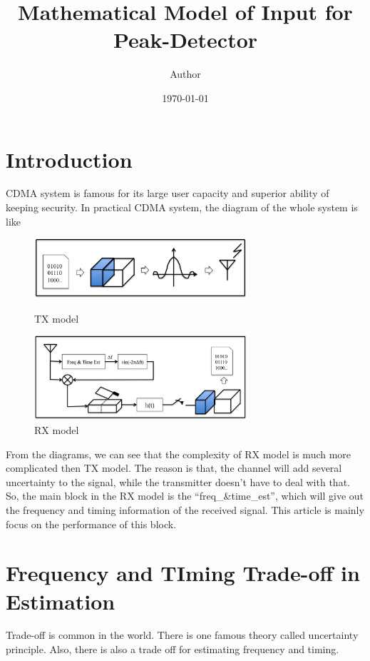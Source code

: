 \documentclass[a4paper]{article}
\title{Mathematical Model of Input for Peak-Detector}
\author{Author}
\date{\today}
\begin{document}

\maketitle
\tableofcontents
\newpage
\section{Introduction} %
\label{sec:Introduction}
CDMA system is famous for its large user capacity and superior ability of keeping security. In practical CDMA system, the diagram of the whole system is like 
\begin{figure}[ht]
	\centering
	\includegraphics[width=3.1in]{figure/tx.png}
	\caption{TX model}
	\label{fig:TX diagram}
	\includegraphics[width = 3.1in]{figure/rx.png}
	\caption{RX model}
	\label{fig：RX diagram}
\end{figure}

From the diagrams, we can see that the complexity of RX model is much more complicated then TX model. The reason is that, the channel will add several uncertainty to the signal, while the transmitter doesn't have to deal with that. So, the main block in the RX model is the ``freq\_\&time\_est'', which will give out the frequency and timing information of the received signal. This article is mainly focus on the performance of this block. 

\section{Frequency and TIming Trade-off in Estimation}

Trade-off is common in the world. There is one famous theory called uncertainty principle\cite{Uncertainty_Principle}. Also, there is also a trade off for estimating frequency and timing.
\end{document}
